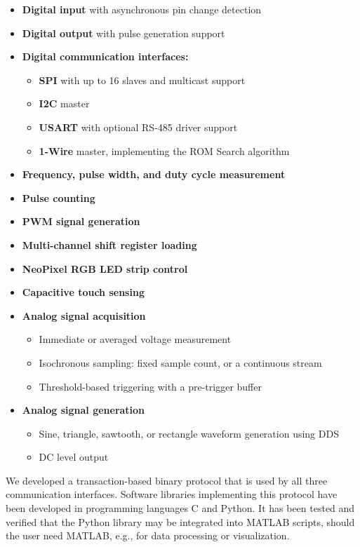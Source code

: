 \begin{itemize}[itemsep=1pt]
	\item \textbf{Digital input} with asynchronous pin change detection
	\item \textbf{Digital output} with pulse generation support
	\item \textbf{Digital communication interfaces:}	
\begin{itemize}
\item \textbf{\gls{SPI}} with up to 16 slaves and multicast support
\item \textbf{\gls{I2C}} master
\item \textbf{\gls{USART}} with optional RS-485 driver support
\item \textbf{1-Wire} master, implementing the \gls{ROM} Search algorithm
\end{itemize}
	\item \textbf{Frequency, pulse width, and duty cycle measurement}
	\item \textbf{Pulse counting}
	\item \textbf{\gls{PWM} signal generation}	
	\item \textbf{Multi-channel shift register loading}
	\item \textbf{NeoPixel RGB \gls{LED} strip control}
	\item \textbf{Capacitive touch sensing}
	\item \textbf{Analog signal acquisition}
		\begin{itemize}
			\item Immediate or averaged voltage measurement
			\item Isochronous sampling: fixed sample count, or a continuous stream
			\item Threshold-based triggering with a pre-trigger buffer
		\end{itemize}
	\item \textbf{Analog signal generation}
		\begin{itemize}
			\item Sine, triangle, sawtooth, or rectangle waveform generation using \gls{DDS}
			\item \gls{DC} level output
		\end{itemize}
\end{itemize}


We developed a transaction-based binary protocol that is used by all three communication interfaces. Software libraries implementing this protocol have been developed in programming languages C and Python. It has been tested and verified that the Python library may be integrated into MATLAB scripts, should the user need MATLAB, e.g., for data processing or visualization.


